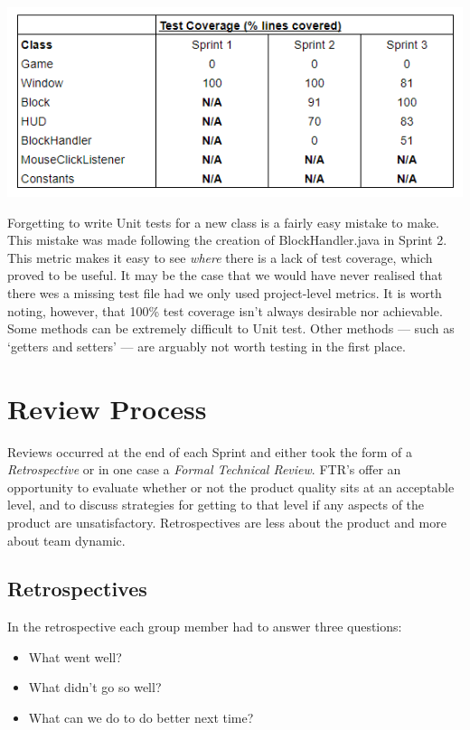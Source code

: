 \documentclass[12pt]{article}
\begin{document}
\begin{center}
    \includegraphics[scale=0.7]{images/class_level.png}
\end{center}

Forgetting to write Unit tests for a new class is a fairly easy mistake to make. This mistake was made following the creation of BlockHandler.java in Sprint 2. This metric makes it easy to see \emph{where} there is a lack of test coverage, which proved to be useful. It may be the case that we would have never realised that there wes a missing test file had we only used project-level metrics. It is worth noting, however, that 100\% test coverage isn't always desirable nor achievable. Some methods can be extremely difficult to Unit test. Other methods --- such as `getters and setters' --- are arguably not worth testing in the first place.

\section{Review Process}

Reviews occurred at the end of each Sprint and either took the form of a \emph{Retrospective} or in one case a \emph{Formal Technical Review}. FTR's offer an opportunity to evaluate whether or not the product quality sits at an acceptable level, and to discuss strategies for getting to that level if any aspects of the product are unsatisfactory. Retrospectives are less about the product and more about team dynamic.

\subsection{Retrospectives}

In the retrospective each group member had to answer three questions:

\begin{itemize}
\item What went well?
\item What didn’t go so well?
\item What can we do to do better next time?
\end{itemize}
\end{document}
